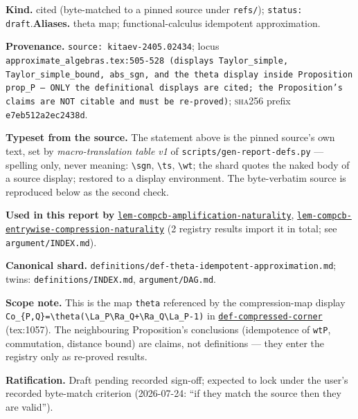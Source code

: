 \begin{defnote}
\textbf{Kind.} cited (byte-matched to a pinned source under \texttt{refs/}); \texttt{status: draft}.\quad\textbf{Aliases.} theta map; functional-calculus idempotent approximation.
\par
\textbf{Provenance.} \texttt{source: kitaev-\allowbreak{}2405.\allowbreak{}02434}; locus \texttt{approximate\_algebras.\allowbreak{}tex:\allowbreak{}505-\allowbreak{}528 (displays Taylor\_simple,\allowbreak{} Taylor\_simple\_bound,\allowbreak{} abs\_sgn,\allowbreak{} and the theta display inside Proposition prop\_P ---\allowbreak{} ONLY the definitional displays are cited;\allowbreak{} the Proposition's claims are NOT citable and must be re-\allowbreak{}proved)}; \textsc{sha256} prefix \texttt{e7eb512a2ec2438d}.
\par
\textbf{Typeset from the source.} The statement above is the pinned source's own text, set by \emph{macro-translation table v1} of \texttt{scripts/gen-report-defs.py} --- spelling only, never meaning: \texttt{\textbackslash{}sgn}, \texttt{\textbackslash{}ts}, \texttt{\textbackslash{}wt}; the shard quotes the naked body of a source display; restored to a display environment. The byte-verbatim source is reproduced below as the second check.
\par
\textbf{Used in this report by} \hyperref[lem:compcb-amplification-naturality]{\texttt{lem-\allowbreak{}compcb-\allowbreak{}amplification-\allowbreak{}naturality}}, \hyperref[lem:compcb-entrywise-compression-naturality]{\texttt{lem-\allowbreak{}compcb-\allowbreak{}entrywise-\allowbreak{}compression-\allowbreak{}naturality}} (2 registry results import it in total; see \texttt{argument/INDEX.md}).
\par
\textbf{Canonical shard.} \texttt{definitions/\allowbreak{}def-\allowbreak{}theta-\allowbreak{}idempotent-\allowbreak{}approximation.\allowbreak{}md}; twins: \texttt{definitions/INDEX.md}, \texttt{argument/DAG.md}.
\par
\textbf{Scope note.} This is the map \texttt{theta} referenced by the compression-map
display \texttt{Co\_\{P,\allowbreak{}Q\}=\textbackslash{}theta(\textbackslash{}La\_P\textbackslash{}Ra\_Q+\textbackslash{}Ra\_Q\textbackslash{}La\_P-\allowbreak{}1)} in
\hyperref[def:compressed-corner]{\texttt{def-\allowbreak{}compressed-\allowbreak{}corner}} (tex:1057). The neighbouring Proposition's
conclusions (idempotence of \texttt{wtP}, commutation, distance bound) are claims,
not definitions --- they enter the registry only as re-proved results.

\textbf{Ratification.} Draft pending recorded sign-off; expected to lock under the
user's recorded byte-match criterion (2026-07-24: ``if they match the source
then they are valid'').
\end{defnote}
